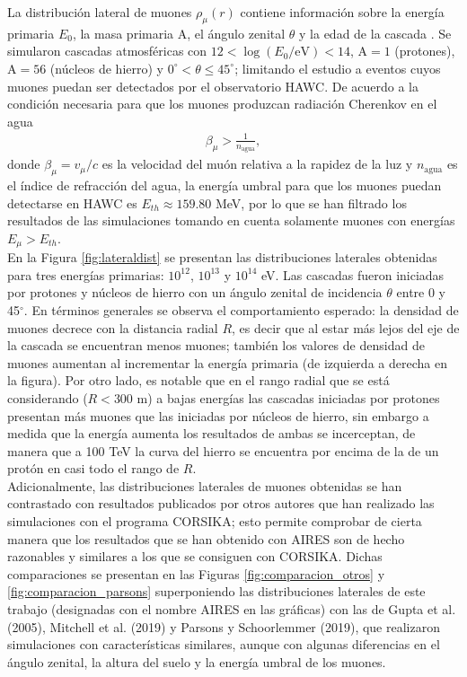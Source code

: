 \documentclass[12pt,letterpaper]{report}
\begin{document}
La distribuci\'on lateral de muones $\rho_{\mu}(r)$ contiene informaci\'on sobre la energ\'ia primaria $E_0$, la masa primaria A, el \'angulo zenital $\theta$ y la edad de la cascada \cite{Albrecht2021a}. Se simularon cascadas atmosf\'ericas con $12 < \log(E_0/\text{eV}) < 14$, A$=1$ (protones), A$=56$ (n\'ucleos de hierro) y $0^{\circ} < \theta \leq 45^{\circ}$; limitando el estudio a eventos cuyos muones puedan ser detectados por el observatorio HAWC. De acuerdo a la condici\'on necesaria para que los muones produzcan radiaci\'on Cherenkov en el agua
	\begin{align}
	\beta_{\mu} > \frac{1}{n_{\text{agua}}},
	\end{align}
donde $\beta_{\mu}=v_{\mu}/c$ es la velocidad del mu\'on relativa a la rapidez de la luz y $n_{\text{agua}}$ es el \'indice de refracci\'on del agua, la energ\'ia umbral para que los muones puedan detectarse en HAWC es $E_{th}\approx 159.80$ MeV, por lo que se han filtrado los resultados de las simulaciones tomando en cuenta solamente muones con energ\'ias $E_{\mu} > E_{th}$. \\
	
En la Figura \ref{fig:lateraldist} se presentan las distribuciones laterales obtenidas para tres energ\'ias primarias: $10^{12}$, $10^{13}$ y $10^{14}$ eV. Las cascadas fueron iniciadas por protones y n\'ucleos de hierro con un \'angulo zenital de incidencia $\theta$ entre 0 y 45$^{\circ}$. En t\'erminos generales se observa el comportamiento esperado: la densidad de muones decrece con la distancia radial $R$, es decir que al estar m\'as lejos del eje de la cascada se encuentran menos muones; tambi\'en los valores de densidad de muones aumentan al incrementar la energ\'ia primaria (de izquierda a derecha en la figura). Por otro lado, es notable que en el rango radial que se est\'a considerando ($R<300$ m) a bajas energ\'ias las cascadas iniciadas por protones presentan m\'as muones que las iniciadas por n\'ucleos de hierro, sin embargo a medida que la energ\'ia aumenta los resultados de ambas se incerceptan, de manera que a 100 TeV la curva del hierro se encuentra por encima de la de un prot\'on en casi todo el rango de $R$. \\
	
Adicionalmente, las distribuciones laterales de muones obtenidas se han contrastado con resultados publicados por otros autores que han realizado las simulaciones con el programa CORSIKA; esto permite comprobar de cierta manera que los resultados que se han obtenido con AIRES son de hecho razonables y similares a los que se consiguen con CORSIKA. Dichas comparaciones se presentan en las Figuras \ref{fig:comparacion_otros} y \ref{fig:comparacion_parsons} superponiendo las distribuciones laterales de este trabajo (designadas con el nombre AIRES en las gr\'aficas) con las de Gupta et al. (2005), Mitchell et al. (2019) y Parsons y Schoorlemmer (2019), que realizaron simulaciones con caracter\'isticas similares, aunque con algunas diferencias en el \'angulo zenital, la altura del suelo y la energ\'ia umbral de los muones.\\
\end{document}
